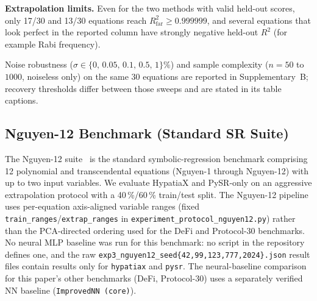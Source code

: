 \documentclass[twoside,11pt]{article}
\newcommand{\Rsq}{R^{2}}
\begin{document}
\textbf{Extrapolation limits.} Even for the two methods with valid held-out scores, only 17/30 and 13/30
equations reach $\Rsq_{\text{far}} \geq 0.999999$, and several equations that look perfect in the reported
column have strongly negative held-out $\Rsq$ (for example Rabi frequency).



Noise robustness ($\sigma \in \{0,\,0.05,\,0.1,\,0.5,\,1\}\%$) and sample complexity ($n=50$ to $1000$, noiseless only) on the same 30 equations are reported in Supplementary~B; recovery thresholds differ between those sweeps and are stated in its table captions.

\subsection{Nguyen-12 Benchmark (Standard SR Suite)}\label{subsec:nguyen12-benchmark-standard-sr-suite}
\label{sec:nguyen12}

The Nguyen-12 suite~\citep{uy2011semantically} is the standard symbolic-regression
benchmark comprising 12 polynomial and transcendental equations (Nguyen-1 through
Nguyen-12) with up to two input variables.  We evaluate HypatiaX and PySR-only on
an aggressive extrapolation protocol with a 40\,\%/60\,\% train/test split.
The Nguyen-12 pipeline uses per-equation axis-aligned variable ranges (fixed
\texttt{train\_ranges}/\texttt{extrap\_ranges} in \texttt{experiment\_protocol\_nguyen12.py})
rather than the PCA-directed ordering used for the DeFi and Protocol-30 benchmarks.
No neural MLP baseline was run for this benchmark: no script in the repository defines
one, and the raw \texttt{exp3\_nguyen12\_seed\{42,99,123,777,2024\}.json} result files
contain results only for \texttt{hypatiax} and \texttt{pysr}. The neural-baseline
comparison for this paper's other benchmarks (DeFi, Protocol-30) uses a separately
verified NN baseline (\texttt{ImprovedNN (core)}).
\end{document}
